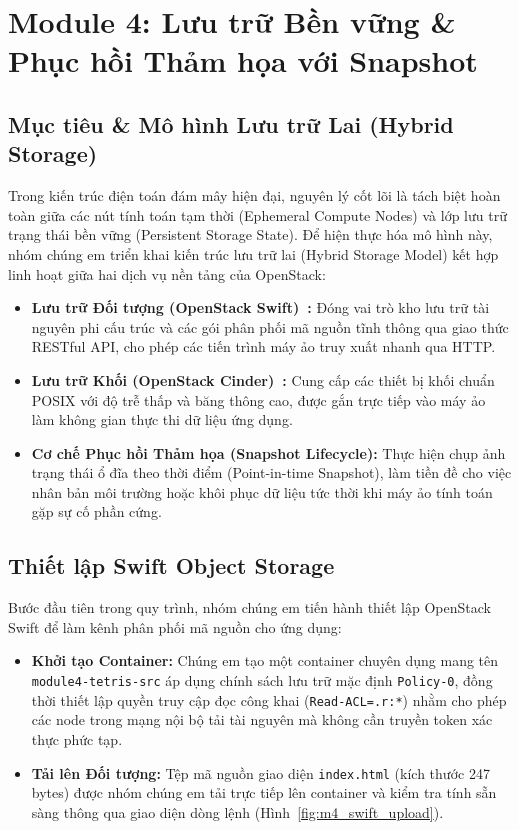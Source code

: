 \section{Module 4: Lưu trữ Bền vững \& Phục hồi Thảm họa với Snapshot}

\subsection{Mục tiêu \& Mô hình Lưu trữ Lai (Hybrid Storage)}
Trong kiến trúc điện toán đám mây hiện đại, nguyên lý cốt lõi là tách biệt hoàn toàn giữa các nút tính toán tạm thời (Ephemeral Compute Nodes) và lớp lưu trữ trạng thái bền vững (Persistent Storage State). Để hiện thực hóa mô hình này, nhóm chúng em triển khai kiến trúc lưu trữ lai (Hybrid Storage Model) kết hợp linh hoạt giữa hai dịch vụ nền tảng của OpenStack:
\begin{itemize}
    \item \textbf{Lưu trữ Đối tượng (OpenStack Swift)~\cite{swift_storage}:} Đóng vai trò kho lưu trữ tài nguyên phi cấu trúc và các gói phân phối mã nguồn tĩnh thông qua giao thức RESTful API, cho phép các tiến trình máy ảo truy xuất nhanh qua HTTP.
    \item \textbf{Lưu trữ Khối (OpenStack Cinder)~\cite{cinder_storage}:} Cung cấp các thiết bị khối chuẩn POSIX với độ trễ thấp và băng thông cao, được gắn trực tiếp vào máy ảo làm không gian thực thi dữ liệu ứng dụng.
    \item \textbf{Cơ chế Phục hồi Thảm họa (Snapshot Lifecycle):} Thực hiện chụp ảnh trạng thái ổ đĩa theo thời điểm (Point-in-time Snapshot), làm tiền đề cho việc nhân bản môi trường hoặc khôi phục dữ liệu tức thời khi máy ảo tính toán gặp sự cố phần cứng.
\end{itemize}

\subsection{Thiết lập Swift Object Storage}
Bước đầu tiên trong quy trình, nhóm chúng em tiến hành thiết lập OpenStack Swift để làm kênh phân phối mã nguồn cho ứng dụng:
\begin{itemize}
    \item \textbf{Khởi tạo Container:} Chúng em tạo một container chuyên dụng mang tên \nolinkurl{module4-tetris-src} áp dụng chính sách lưu trữ mặc định \texttt{Policy-0}, đồng thời thiết lập quyền truy cập đọc công khai (\nolinkurl{Read-ACL=.r:*}) nhằm cho phép các node trong mạng nội bộ tải tài nguyên mà không cần truyền token xác thực phức tạp.
    \item \textbf{Tải lên Đối tượng:} Tệp mã nguồn giao diện \texttt{index.html} (kích thước 247 bytes) được nhóm chúng em tải trực tiếp lên container và kiểm tra tính sẵn sàng thông qua giao diện dòng lệnh (Hình~\ref{fig:m4_swift_upload}).
\end{itemize}

